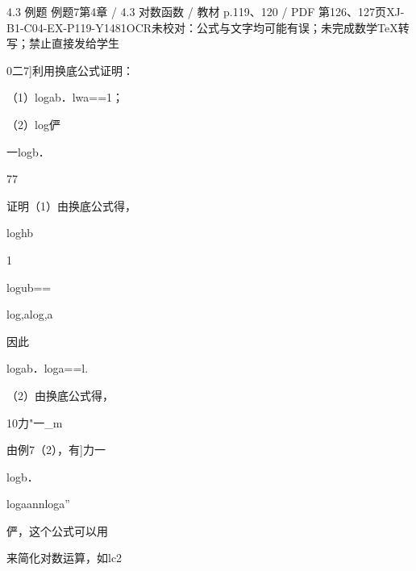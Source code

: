 \begin{bankitem}{4.3 例题 例题7}{第4章 / 4.3 对数函数 / 教材 p.119、120 / PDF 第126、127页}{XJ-B1-C04-EX-P119-Y1481}{OCR未校对：公式与文字均可能有误；未完成数学TeX转写；禁止直接发给学生}
\begin{ocrdraft}
\par
0二7]利用换底公式证明：
\par
（1）logab．lwa==1；
\par
（2）log俨
\par
一logb．
\par
77
\par
证明（1）由换底公式得，
\par
[教材p.120 / PDF第127页]
\par
loghb
\par
1
\par
logub==
\par
log,alog,a
\par
因此
\par
logab．loga==l.
\par
（2）由换底公式得，
\par
10力"一\_m
\par
由例7（2），有]力一
\par
{}logb．
\par
logaannloga”
\par
俨，这个公式可以用
\par
来简化对数运算，如lc2
\end{ocrdraft}
\end{bankitem}
